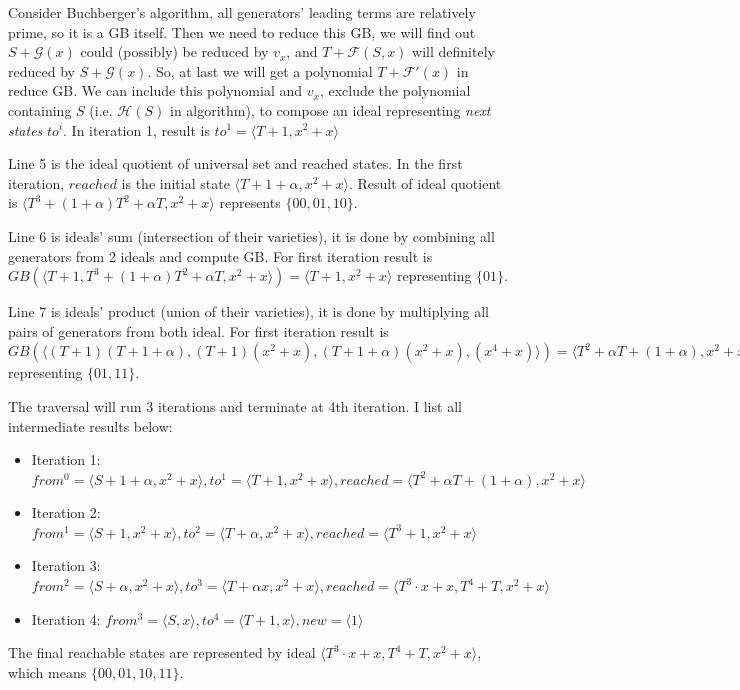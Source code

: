 \begin{Example}
Consider Buchberger's algorithm, all generators' leading terms are relatively prime, so it is a GB itself. 
Then we need to reduce this GB, we will find out $S + \mathcal G(x)$ could (possibly) be reduced by $v_x$,
and $T+\mathcal F(S,x)$ will definitely reduced by $S + \mathcal G(x)$. So, at last we will get a polynomial
$T + \mathcal F'(x)$ in reduce GB. We can include this polynomial and $v_x$, exclude the polynomial containing
$S$ (i.e. $\mathcal H(S)$ in algorithm), to compose an ideal representing \emph{next states} $to^i$. In iteration 1, result is $to^1 = \langle T+1, x^2+x\rangle$

Line 5 is the ideal quotient of universal set and reached states. In the first iteration, 
$reached$ is the initial state $\langle T+1+\alpha, x^2+x \rangle$. Result of ideal quotient
is $\langle T^3+(1+\alpha)T^2+\alpha T, x^2+x\rangle$ represents $\{00,01,10\}$.

Line 6 is ideals' sum (intersection of their varieties), it is done by combining all generators
from 2 ideals and compute GB. For first iteration result is $GB(\langle T+1,T^3+(1+\alpha)T^2+\alpha T, x^2+x\rangle) = \langle T+1, x^2+x\rangle$ representing $\{01\}$.

Line 7 is ideals' product (union of their varieties), it is done by multiplying all pairs of
generators from both ideal. For first iteration result is $GB(\langle (T+1)(T+1+\alpha),
(T+1)(x^2+x), (T+1+\alpha)(x^2+x), (x^4+x)\rangle) = \langle T^2+\alpha T+(1+\alpha), x^2+x\rangle$ representing $\{01,11\}$.

The traversal will run 3 iterations and terminate at 4th iteration. I list all intermediate 
results below:
\begin{itemize}
\item Iteration 1: $from^0 = \langle S+1+\alpha, x^2+x\rangle, to^1 = \langle T+1, x^2+x\rangle,
 reached = \langle T^2+\alpha T+(1+\alpha), x^2+x\rangle$
\item Iteration 2: $from^1 = \langle S+1, x^2+x\rangle, to^2= \langle T+\alpha, x^2+x\rangle,
reached = \langle T^3+1, x^2+x\rangle$
\item Iteration 3: $from^2 = \langle S+\alpha, x^2+x\rangle, to^3 = \langle T+\alpha x, x^2+x
\rangle, reached = \langle T^3\cdot x+x, T^4+T, x^2+x\rangle$
\item Iteration 4: $from^3 = \langle S, x\rangle, to^4 = \langle T+1, x\rangle, new = \langle1\rangle$
\end{itemize}
The final reachable states are represented by ideal $\langle T^3\cdot x+x, T^4+T, x^2+x\rangle$,
which means $\{00,01,10,11\}$.
\end{Example}

